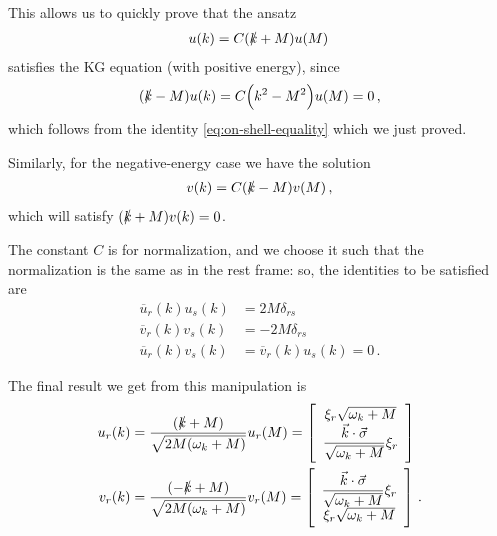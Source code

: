 \documentclass[main.tex]{subfiles}
\begin{document}
This allows us to quickly prove that the ansatz 
%
\begin{align}
u(k) = C (\slashed{k} + M) u(M)
\,
\end{align}
%
satisfies the KG equation (with positive energy), since 
%
\begin{align}
(\slashed{k} - M) u(k) = C \qty(k^2 - M^2) u(M) = 0
\,,
\end{align}
%
which follows from the identity \eqref{eq:on-shell-equality} which we just proved.


Similarly, for the negative-energy case we have the solution 
%
\begin{align}
v(k) = C (\slashed{k} - M )v(M)
\,,
\end{align}
%
which will satisfy \((\slashed{k} + M) v(k) = 0\).

The constant \(C\) is for normalization, and we choose it such that the normalization is the same as in the rest frame: so, the identities to be satisfied are 
%
\begin{subequations}
\begin{align} \label{eq:normalization-spinor}
\overline{u}_{r} (k) u_{s}(k) &= 2 M \delta_{rs}  \\
\overline{v}_{r} (k) v_{s}(k) &= - 2 M \delta_{rs}  \\
\overline{u}_{r} (k) v_{s}(k) &=   
\overline{v}_{r} (k) u_{s}(k) = 0  
\,.
\end{align}
\end{subequations}

\begin{claim}
The final result we get from this manipulation is 
%
\begin{subequations} \label{eq:dirac-equation-solutions}
\begin{align}
u_r (k) &= \frac{(\slashed{k} + M)}{\sqrt{2 M \qty(\omega_{k} + M )}} u_r (M)
= \left[\begin{array}{c}
\xi_{r}\sqrt{\omega_{k} + M} \\ 
\displaystyle
\frac{\vec{k} \cdot \vec{\sigma}}{\sqrt{\omega_{k} + M}} 
\xi_{r}
\end{array}\right] \label{eq:positive-energy-dirac-solution-momentum-space}\\
v_r (k) &= \frac{(-\slashed{k} + M)}{\sqrt{2 M \qty(\omega_{k} + M )}} v_r (M)
= \left[\begin{array}{c}
\displaystyle
\frac{\vec{k} \cdot \vec{\sigma}}{\sqrt{\omega_{k} + M}} \xi_{r}\\
\xi_{r}\sqrt{\omega_{k} + M} 
\end{array}\right]
\,.
\end{align}
\end{subequations}
\end{claim}
\end{document}

